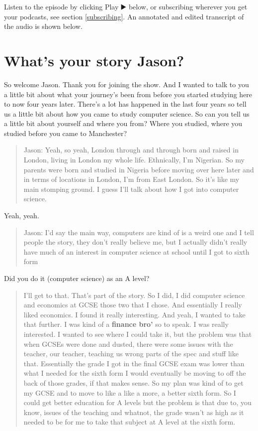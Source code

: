 \documentclass[
]{book}
\begin{document}
Listen to the episode by clicking Play ▶️ below, or subscribing wherever you get your podcasts, see section \ref{subscribing}. An annotated and edited transcript of the audio is shown below.

\hypertarget{jason-story}{%
\section{What's your story Jason?}\label{jason-story}}

So welcome Jason. Thank you for joining the show. And I wanted to talk to you a little bit about what your journey's been from before you started studying here to now four years later. There's a lot has happened in the last four years so tell us a little bit about how you came to study computer science. So can you tell us a little bit about yourself and where you from? Where you studied, where you studied before you came to Manchester?

\begin{quote}
Jason: Yeah, so yeah, London through and through born and raised in London, living in London my whole life. Ethnically, I'm Nigerian. So my parents were born and studied in Nigeria before moving over here later and in terms of locations in London, I'm from East London. So it's like my main stomping ground. I guess I'll talk about how I got into computer science.
\end{quote}

Yeah, yeah.

\begin{quote}
Jason: I'd say the main way, computers are kind of is a weird one and I tell people the story, they don't really believe me, but I actually didn't really have much of an interest in computer science at school until I got to sixth form
\end{quote}

Did you do it (computer science) as an A level?

\begin{quote}
I'll get to that. That's part of the story. So I did, I did computer science and economics at GCSE those two that I chose. And essentially I really liked economics. I found it really interesting. And yeah, I wanted to take that further. I was kind of a \textbf{finance bro'} so to speak. I was really interested. I wanted to see where I could take it, but the problem was that when GCSEs were done and dusted, there were some issues with the teacher, our teacher, teaching us wrong parts of the spec and stuff like that. Essentially the grade I got in the final GCSE exam was lower than what I needed for the sixth form I would eventually be moving to off the back of those grades, if that makes sense. So my plan was kind of to get my GCSE and to move to like a like a more, a better sixth form. So I could get better education for A levels but the problem is that due to, you know, issues of the teaching and whatnot, the grade wasn't as high as it needed to be for me to take that subject at A level at the sixth form.
\end{quote}
\end{document}
